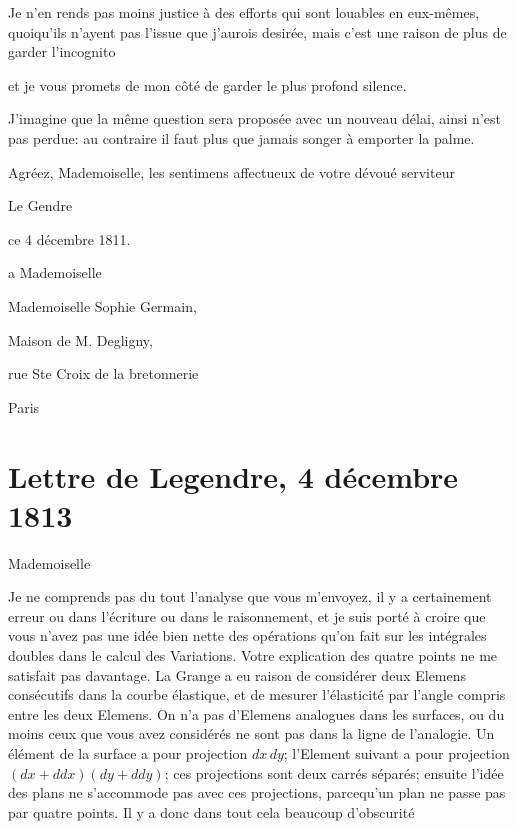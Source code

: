 \documentclass[11pt,a4paper]{article}
\begin{document}
Je n'en rends pas moins justice à des efforts qui sont louables en
eux-mêmes, quoiqu'ils n'ayent pas l'issue que j'aurois desirée, mais c'est
une raison de plus de garder l'incognito


et je vous promets de mon côté de garder le plus profond silence.

J'imagine que la même question sera proposée avec un nouveau délai, ainsi
 n'est pas perdue: au contraire il faut plus que
jamais songer à emporter la palme.

Agréez, Mademoiselle, les sentimens affectueux de votre dévoué serviteur

Le Gendre

ce 4 décembre 1811.

a Mademoiselle

Mademoiselle Sophie Germain,

Maison de M. Degligny,

rue Ste Croix de la bretonnerie

Paris


\section{Lettre de Legendre, 4 décembre 1813}

Mademoiselle

Je ne comprends pas du tout l'analyse que vous m'envoyez, il y a certainement
erreur ou dans l'écriture ou dans le raisonnement, et je suis porté à croire
que vous n'avez pas une idée bien nette des opérations qu'on fait sur les
intégrales doubles dans le calcul des Variations. Votre explication des
quatre points ne me satisfait pas davantage. La Grange a eu raison de
considérer deux Elemens consécutifs dans la courbe élastique, et de mesurer
l'élasticité par l'angle compris entre les deux Elemens. On n'a pas
d'Elemens analogues dans les surfaces, ou du moins ceux que vous avez
considérés ne sont pas dans la ligne de l'analogie. Un élément de la surface
a pour projection $dx\,dy$; l'Element suivant a pour projection
$(dx + ddx)(dy + ddy)$; ces projections sont deux carrés séparés; ensuite
l'idée des plans ne s'accommode pas avec ces projections, parcequ'un plan ne
passe pas par quatre points. Il y a donc dans tout cela beaucoup d'obscurité
\end{document}
